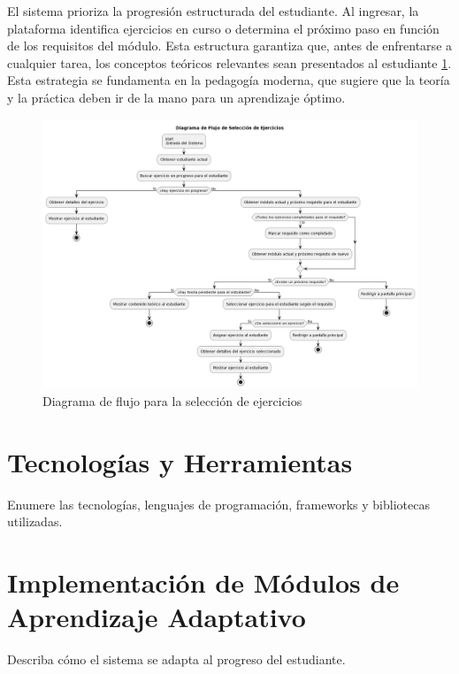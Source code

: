 El sistema prioriza la progresión estructurada del estudiante. Al ingresar, la plataforma identifica ejercicios en curso o determina el próximo paso en función de los requisitos del módulo. Esta estructura garantiza que, antes de enfrentarse a cualquier tarea, los conceptos teóricos relevantes sean presentados al estudiante \ref{fig:seleccion}. Esta estrategia se fundamenta en la pedagogía moderna, que sugiere que la teoría y la práctica deben ir de la mano para un aprendizaje óptimo.

\begin{figure}[H]
\centering
\includegraphics[width=\textwidth]{imagenes/seleccionejercicios.png}
\caption{Diagrama de flujo para la selección de ejercicios}
\label{fig:seleccion}
\end{figure}

\section{Tecnologías y Herramientas}
Enumere las tecnologías, lenguajes de programación, frameworks y bibliotecas utilizadas.

\section{Implementación de Módulos de Aprendizaje Adaptativo}
Describa cómo el sistema se adapta al progreso del estudiante.
